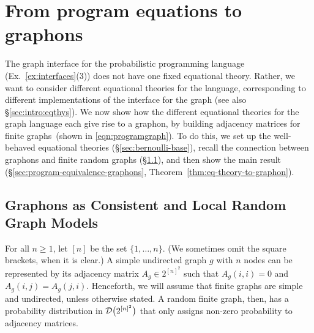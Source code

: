 
\section{From program equations to graphons}\label{sec:prog-eq-to-graphons}

The graph interface for the probabilistic programming language (Ex.~\ref{ex:interfaces}(3))
does not have one fixed equational theory. Rather, we want to consider different equational theories for the language, corresponding to different implementations of the interface for the graph (see also \S\ref{sec:intro:eqthys}).
We now show how the different equational theories for the graph language each
give rise to a graphon, by building adjacency matrices for finite graphs~(shown in \eqref{eqn:programgraph}). To do this, we set up the well-behaved equational theories (\S\ref{sec:bernoulli-base}), recall the connection between graphons and finite random graphs (\S\ref{sec:graphons}), and then show the main result (\S\ref{sec:program-equivalence-graphons}, Theorem~\ref{thm:eq-theory-to-graphon}). 


\subsection{Graphons as Consistent and Local Random Graph Models}
\label{sec:graphons}
For all $n ≥ 1$, let $[n]$ be the set $\{1,…,n\}$. (We sometimes omit
the square brackets, when it is clear.)
A simple undirected graph $g$ with $n$ nodes can be represented by its adjacency matrix $A_g\in 2^{[n]^2}$ such that $A_g(i,i)=0$ and $A_g(i,j)= A_g(j,i)$. Henceforth, we will assume that finite graphs are simple and undirected, unless otherwise stated. 
A random finite graph, then, has a probability distribution in
$\mathcal{D}\big(2^{[n]^2}\big)$ that only assigns non-zero probability to adjacency matrices.

